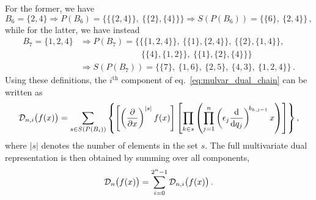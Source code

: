 For the former, we have
$$B_6 = \{2,4\} \Rightarrow P(B_6) = \{\{\{2,4\}\},\ \{\{2\},\{4\}\}\} \Rightarrow S(P(B_6)) = \{\{6\},\ \{2,4\}\}\,,$$
while for the latter, we have instead
\begin{align*}
    B_7 = \{1,2,4\} 
    & \Rightarrow P(B_7) =\{\{\{1,2,4\}\},\ \{\{1\},\{2,4\}\},\ \{\{2\},\{1,4\}\},\\
    & \phantom{\Rightarrow P(B_7) =\{\ } \{\{4\},\{1,2\}\},\ \{\{1\},\{2\},\{4\}\}\} \\ 
    & \Rightarrow S(P(B_7)) = \{\{7\},\ \{1,6\},\ \{2,5\},\ \{4,3\},\ \{1,2,4\}\}\,.
\end{align*}
Using these definitions, the $i^{\mathrm{th}}$ component of eq.~\eqref{eq:mulvar_dual_chain} can be written as
\begin{equation}
    {\cal D}_{n,i}\big( f(x)\big) = \sum_{s\in S(P(B_i))} \left\{ \left[   
    \left(\frac{\partial}{\partial x}\right)^{|s|}f(x)\right] \left[\prod_{k \in s}  \left( \prod_{j=1}^{n} \left( \epsilon_j \frac{\mathrm{d}}{\mathrm{d} q_{j}}\right)^{\!b_{k,j-1}} x \right) \right] \right\},
\label{eq:dual_chain_component}
\end{equation}
where $|s|$ denotes the number of elements in the set $s$. The full multivariate dual representation is then obtained by summing over all components,
\begin{equation}
     {\cal D}_{n}\big( f(x)\big) = \sum_{i=0}^{2^n-1} {\cal D}_{n,i}\big( f(x)\big)\, .
\end{equation}

